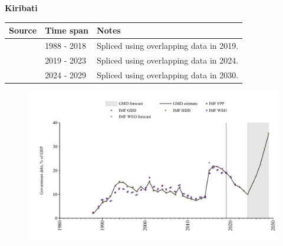 \documentclass[12pt,a4paper,landscape]{article}
\begin{document}
\begin{adjustbox}{max totalsize={\paperwidth}{\paperheight},center}
\begin{minipage}[t][\textheight][t]{\textwidth}
\vspace*{0.5cm}
{}
\begin{center}
{\Large\bfseries Kiribati}
\end{center}
\vspace{0.5cm}
\begin{table}[H]
\centering
\small
\begin{tabular}{|l|l|l|}
\hline
\textbf{Source} & \textbf{Time span} & \textbf{Notes} \\
\hline
\rowcolor{white}\cite{IMF_GDD}& 1988 - 2018 &Spliced using overlapping data in 2019.\\
\rowcolor{lightgray}\cite{IMF_FPP}& 2019 - 2023 &Spliced using overlapping data in 2024.\\
\rowcolor{white}\cite{IMF_WEO_forecast}& 2024 - 2029 &Spliced using overlapping data in 2030.\\
\hline
\end{tabular}
\end{table}
\begin{figure}[H]
\centering
\includegraphics[width=\textwidth,height=0.6\textheight,keepaspectratio]{graphs/KIR_govdebt_GDP.pdf}
\end{figure}
\end{minipage}
\end{adjustbox}
\end{document}
